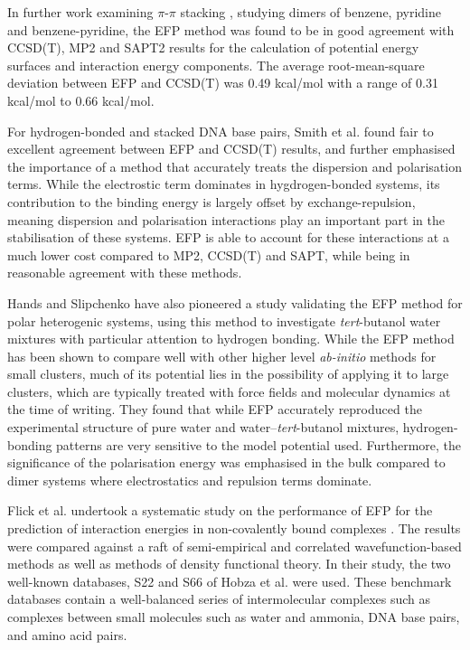 In further work examining $\pi$-$\pi$ stacking
\cite{Smith2008a}, 
studying dimers of benzene, pyridine and benzene-pyridine, the EFP method was found to be in good agreement with CCSD(T), MP2 and SAPT2 results for the calculation of potential energy surfaces and interaction energy components.
The average root-mean-square deviation between EFP and CCSD(T) was 0.49 kcal/mol with a range of 0.31 kcal/mol to 0.66 kcal/mol.
\cite{Smith2011a,Slipchenko2009a}


For hydrogen-bonded and stacked DNA base pairs, Smith et al. found fair to excellent agreement between EFP and CCSD(T) results, and further emphasised the importance of a method that accurately treats the dispersion and polarisation terms.
While the electrostic term dominates in hygdrogen-bonded systems, its contribution to the binding energy is largely offset by exchange-repulsion, meaning dispersion and polarisation interactions play an important part in the stabilisation of these systems.
EFP is able to account for these interactions at a much lower cost compared to MP2, CCSD(T) and SAPT, while being in reasonable agreement with these methods.
\cite{Smith2011b}


Hands and Slipchenko have also pioneered a study validating the EFP method for polar heterogenic systems,
\cite{Hands2012a}
using this method to investigate \emph{tert}-butanol water mixtures with particular attention to hydrogen bonding.
While the EFP method has been shown to compare well with other higher level \emph{ab-initio} methods for small clusters, much of its potential lies in the possibility of applying it to large clusters, which are typically treated with force fields and molecular dynamics at the time of writing.
They found that while EFP accurately reproduced the experimental structure of pure water and water--\emph{tert}-butanol mixtures, hydrogen-bonding patterns are very sensitive to the model potential used.
Furthermore, the significance of the polarisation energy was emphasised in the bulk compared to dimer systems where electrostatics and repulsion terms dominate.


Flick et al. undertook a systematic study on the performance of EFP for the prediction of interaction energies in non-covalently bound complexes
\cite{Flick2012a}.
The results were compared against a raft of semi-empirical and correlated wavefunction-based methods as well as methods of density functional theory.
In their study, the two well-known databases, S22 and S66 of Hobza et al.
\cite{Jurecka2006a, Rezac2011a}    %
were used.
These benchmark databases contain a well-balanced series of intermolecular complexes such as complexes between small molecules such as water and ammonia, DNA base pairs, and amino acid pairs.


